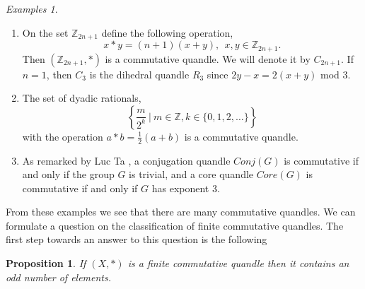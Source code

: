 \documentclass[12pt]{amsart}
\newtheorem{pro}[thm]{Proposition}
\theoremstyle{definition}
\theoremstyle{remark}
\newtheorem{exs}[thm]{Examples}
\begin{document}
\begin{exs}
\begin{enumerate}

\item
 On the set $\mathbb{Z}_{2n+1}$ define the following operation,
$$
x * y = (n+1) (x + y),~~x, y \in \mathbb{Z}_{2n+1}.
$$
Then $(\mathbb{Z}_{2n+1}, *)$ is a commutative quandle. We will denote it by $C_{2n+1}$. If $n=1$, then $C_3 $ is the dihedral quandle $ R_3$ since $2y-x=2(x+y)$ mod $3$.


\item
The set of  dyadic rationals,
$$
\left\{ \frac{m}{2^k} ~|~m \in \mathbb{Z},  k \in \{ 0, 1, 2, \ldots \}   \right\}
$$
with the operation $a * b = \frac{1}{2} (a + b)$ is a commutative quandle.
 


\item 

As remarked by Luc Ta \cite{Ta2026Medial}, a conjugation quandle  $Conj(G)$ is commutative if and only if the group $G$ is trivial,  and a core quandle $Core(G)$ is commutative if and only if $G$ has exponent 3.

 \end{enumerate}

\end{exs}

\noindent
From these examples we see that there are many commutative quandles. We can formulate a question on the classification of finite commutative quandles. The first step towards an answer to this question is the following 


\begin{pro}
If  $(X,*)$ is a finite commutative quandle then it contains an odd number of elements.
\end{pro}
\end{document}
